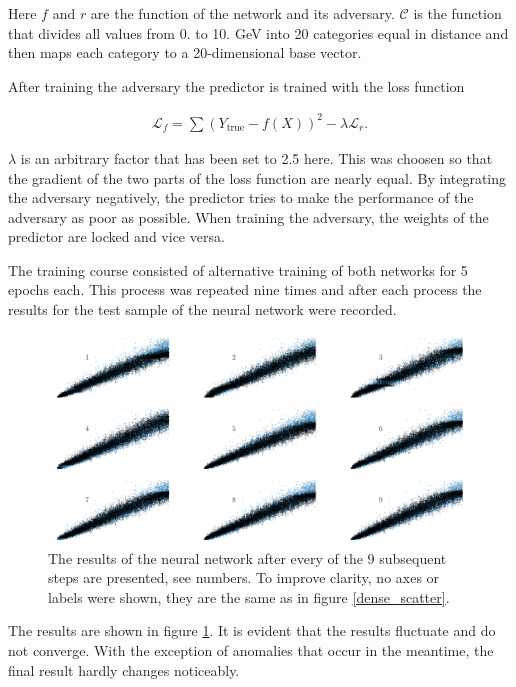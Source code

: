 \documentclass[12pt, a4paper]{thesis}
\begin{document}
Here \(f\) and \(r\) are the function of the network and its
adversary. \(\mathcal{C}\) is the function that divides all values
from 0. to 10. GeV into 20 categories equal in distance and then maps
each category to a 20-dimensional base vector.

After training the adversary the predictor is trained with the loss
function

\begin{align}
\mathcal{L}_f = \sum (Y_{\text{true}} - f(X))^2 - \lambda
\mathcal{L}_r.
\end{align}

\(\lambda\) is an arbitrary factor that has been set to 2.5 here. This
was choosen so that the gradient of the two parts of the loss function
are nearly equal. By integrating the adversary negatively, the
predictor tries to make the performance of the adversary as poor as
possible. When training the adversary, the weights of the predictor
are locked and vice versa.

The training course consisted of alternative training of both networks
for 5 epochs each. This process was repeated nine times and after each
process the results for the test sample of the neural network were
recorded.

\begin{figure}[H]
\centering
\includegraphics[width=.9\linewidth]{../images/adv_scatter.png}
\caption{ The results of the neural network after every of the 9
  subsequent steps are presented, see numbers. To improve clarity, no
  axes or labels were shown, they are the same as in figure
  \ref{dense_scatter}.}
\label{adv_scatter}
\end{figure}

The results are shown in figure \ref{adv_scatter}.  It is evident that
the results fluctuate and do not converge. With the exception of
anomalies that occur in the meantime, the final result hardly changes
noticeably.
\end{document}
